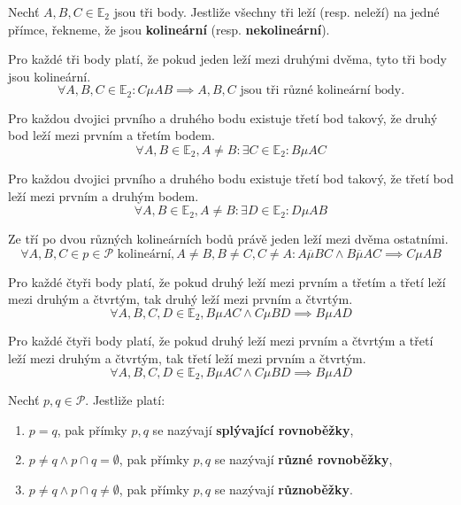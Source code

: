 \begin{definition}
  Nechť $A,B,C\in \mathbb E_2$ jsou tři body. Jestliže všechny tři leží (resp. neleží) na jedné přímce, řekneme, že jsou \textbf{kolineární} (resp. \textbf{nekolineární}).
\end{definition}

\begin{axiom}
  Pro každé tři body platí, že pokud jeden leží mezi druhými dvěma, tyto tři body jsou kolineární.
  $$\forall A, B, C \in \mathbb E_2: C \mu AB \implies A, B, C \text{ jsou tři různé kolineární body.}$$
\end{axiom}

\begin{axiom}
  Pro každou dvojici prvního a druhého bodu existuje třetí bod takový, že druhý bod leží mezi prvním a třetím bodem.
  $$\forall A, B \in \mathbb E_2, A \neq B: \exists C \in \mathbb E_2: B \mu AC$$
\end{axiom}

\begin{axiom}
  Pro každou dvojici prvního a druhého bodu existuje třetí bod takový, že třetí bod leží mezi prvním a druhým bodem.
  $$\forall A, B \in \mathbb E_2, A \neq B: \exists D \in \mathbb E_2: D \mu AB$$
\end{axiom}

\begin{axiom}
  Ze tří po dvou různých kolineárních bodů právě jeden leží mezi dvěma ostatními.
  $$\forall A, B, C \in p \in \mathscr P \text{ kolineární}, A \neq B, B\neq C, C\neq A: A \overline{\mu} BC \land B \overline{\mu} AC \implies C \mu AB$$
\end{axiom}

\begin{axiom}
  Pro každé čtyři body platí, že pokud druhý leží mezi prvním a třetím a třetí leží mezi druhým a čtvrtým, tak druhý leží mezi prvním a čtvrtým.
  $$\forall A, B, C, D \in \mathbb E_2, B \mu AC \land C \mu BD \implies B \mu AD$$
\end{axiom}

\begin{axiom}
  Pro každé čtyři body platí, že pokud druhý leží mezi prvním a čtvrtým a třetí leží mezi druhým a čtvrtým, tak třetí leží mezi prvním a čtvrtým.
  $$\forall A, B, C, D \in \mathbb E_2, B \mu AC \land C \mu BD \implies B \mu AD$$
\end{axiom}

\begin{definition}
  Nechť $p,q\in \mathscr P$. Jestliže platí:
  \begin{enumerate}[$i.$]
    \item $p=q$, pak přímky $p,q$ se nazývají \textbf{splývající rovnoběžky},
    \item $p \ne q \land p\cap q = \emptyset$, pak přímky $p,q$ se nazývají \textbf{různé rovnoběžky},
    \item $p \ne q \land p\cap q \ne \emptyset$, pak přímky $p,q$ se nazývají \textbf{různoběžky}.
  \end{enumerate}
\end{definition}

